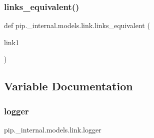 \subsubsection{\texorpdfstring{links\+\_\+equivalent()}{links\_equivalent()}}
{\footnotesize\ttfamily def pip.\+\_\+internal.\+models.\+link.\+links\+\_\+equivalent (\begin{DoxyParamCaption}\item[{}]{link1 }\end{DoxyParamCaption})}



\subsection{Variable Documentation}
\mbox{\label{namespacepip_1_1__internal_1_1models_1_1link_a0f4a689cace1d684305d6d5f7b30d653}} 
\subsubsection{\texorpdfstring{logger}{logger}}
{\footnotesize\ttfamily pip.\+\_\+internal.\+models.\+link.\+logger}

